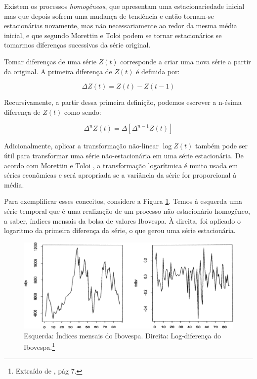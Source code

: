 Existem os processos \emph{homogêneos}, que apresentam uma estacionariedade inicial mas que depois sofrem uma mudança de tendência e então tornam-se estacionárias novamente, mas não necessariamente ao redor da mesma média inicial, e que segundo Morettin e Toloi \citep{morettin} podem se tornar estacionários se tomarmos diferenças sucessivas da série original.

Tomar diferenças de uma série $Z(t)$ corresponde a criar uma nova série a partir da original. A primeira diferença de $Z(t)$ é definida por:

\begin{equation}\label{series:2.12}
\Delta Z(t) = Z(t) - Z(t - 1)
\end{equation}

Recursivamente, a partir dessa primeira definição, podemos escrever a n-ésima diferença de $Z(t)$ como sendo:

\begin{equation}\label{series:2.13}
\Delta^n Z(t) = \Delta[\Delta^{n-1} Z(t)]
\end{equation}

Adicionalmente, aplicar a transformação não-linear $\log Z(t)$ também pode ser útil para transformar uma série não-estacionária em uma série estacionária. De acordo com Morettin e Toloi \citep{morettin}, a transformação logarítmica é muito usada em séries econômicas e será apropriada se a variância da série for proporcional à média.

Para exemplificar esses conceitos, considere a Figura \ref{fig:exe_estac}. Temos à esquerda uma série temporal que é uma realização de um processo não-estacionário homogêneo, a saber, índices mensais da bolsa de valores Ibovespa. À direita, foi aplicado o logaritmo da primeira diferença da série, o que gerou uma série estacionária.

\begin{figure}[htb]
\centering
\includegraphics[width=14cm]{figuras/exemplo_estac}
\caption{Esquerda: Índices mensais do Ibovespa. Direita: Log-diferença do Ibovespa.\footnote{Extraído de \citep{morettin}, pág 7.}}
\label{fig:exe_estac}
\end{figure}

